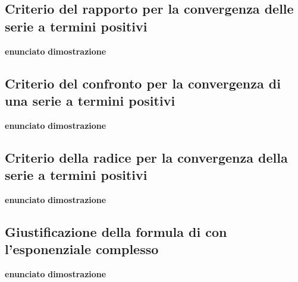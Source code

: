 \documentclass[a4paper, 9pt]{report}
\begin{document}
\newpage
\subsection*{Criterio del rapporto per la convergenza delle serie a termini positivi}
\textbf{enunciato}\newline
\textbf{dimostrazione}\newline





\newpage
\subsection*{Criterio del confronto per la convergenza di una serie a termini positivi}
\textbf{enunciato}\newline
\textbf{dimostrazione}\newline






\newpage
\subsection*{Criterio della radice per la convergenza della serie a termini positivi}
\textbf{enunciato}\newline
\textbf{dimostrazione}\newline






\newpage
\subsection*{Giustificazione della formula di  con l’esponenziale complesso}
\textbf{enunciato}\newline
\textbf{dimostrazione}\newline






\newpage
\end{document}

